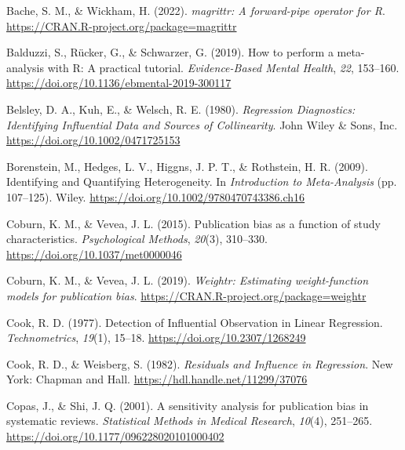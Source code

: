 \documentclass[
  bookmarksnumbered]{article}
\newlength{\cslhangindent}
\newlength{\cslentryspacingunit} %
\newenvironment{CSLReferences}[2] %
 {%
  \setlength{\parindent}{0pt}
  \ifodd #1
  \let\oldpar\par
  \def\par{\hangindent=\cslhangindent\oldpar}
  \fi
  \setlength{\parskip}{#2\cslentryspacingunit}
 }%
 {}
\begin{document}
\hypertarget{refs}{}
\begin{CSLReferences}{1}{0}
\leavevmode{}%
Bache, S. M., \& Wickham, H. (2022). \emph{{magrittr}: A forward-pipe operator for {R}}. \url{https://CRAN.R-project.org/package=magrittr}

\leavevmode{}%
Balduzzi, S., Rücker, G., \& Schwarzer, G. (2019). How to perform a meta-analysis with {R}: A practical tutorial. \emph{Evidence-Based Mental Health}, \emph{22}, 153--160. \url{https://doi.org/10.1136/ebmental-2019-300117}

\leavevmode{}%
Belsley, D. A., Kuh, E., \& Welsch, R. E. (1980). \emph{Regression {Diagnostics}: {Identifying Influential Data} and {Sources} of {Collinearity}}. {John Wiley \& Sons, Inc.} \url{https://doi.org/10.1002/0471725153}

\leavevmode{}%
Borenstein, M., Hedges, L. V., Higgns, J. P. T., \& Rothstein, H. R. (2009). Identifying and {Quantifying Heterogeneity}. In \emph{Introduction to {Meta}-{Analysis}} (pp. 107--125). Wiley. \url{https://doi.org/10.1002/9780470743386.ch16}

\leavevmode{}%
Coburn, K. M., \& Vevea, J. L. (2015). Publication bias as a function of study characteristics. \emph{Psychological Methods}, \emph{20}(3), 310--330. \url{https://doi.org/10.1037/met0000046}

\leavevmode{}%
Coburn, K. M., \& Vevea, J. L. (2019). \emph{Weightr: Estimating weight-function models for publication bias}. \url{https://CRAN.R-project.org/package=weightr}

\leavevmode{}%
Cook, R. D. (1977). Detection of {Influential Observation} in {Linear Regression}. \emph{Technometrics}, \emph{19}(1), 15--18. \url{https://doi.org/10.2307/1268249}

\leavevmode{}%
Cook, R. D., \& Weisberg, S. (1982). \emph{Residuals and {Influence} in {Regression}}. {New York: Chapman and Hall}. \url{https://hdl.handle.net/11299/37076}

\leavevmode{}%
Copas, J., \& Shi, J. Q. (2001). A sensitivity analysis for publication bias in systematic reviews. \emph{Statistical Methods in Medical Research}, \emph{10}(4), 251--265. \url{https://doi.org/10.1177/096228020101000402}


\end{CSLReferences}
\end{document}
